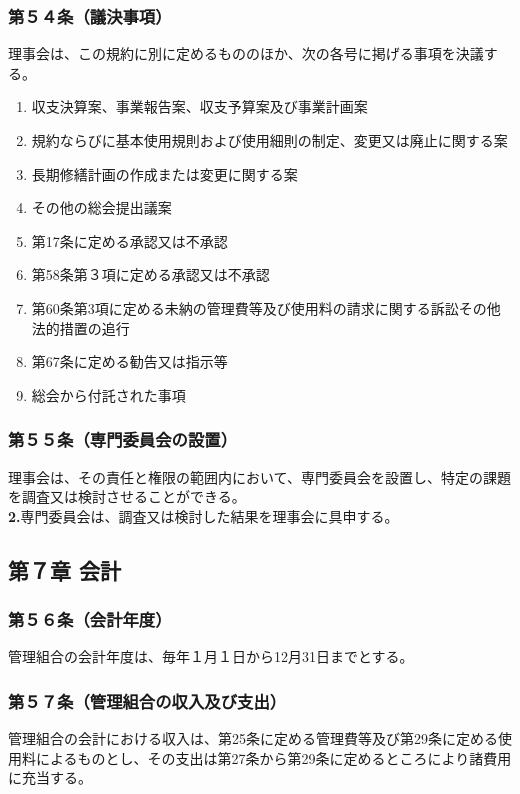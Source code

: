 \documentclass[12pt,uplatex]{jsarticle}
\begin{document}
\subsubsection*{第５４条（議決事項）}
理事会は、この規約に別に定めるもののほか、次の各号に掲げる事項を決議する。
\begin{enumerate}
\item 収支決算案、事業報告案、収支予算案及び事業計画案
\item 規約ならびに基本使用規則および使用細則の制定、変更又は廃止に関する案
\item 長期修繕計画の作成または変更に関する案
\item その他の総会提出議案
\item 第17条に定める承認又は不承認
\item 第58条第３項に定める承認又は不承認
\item 第60条第3項に定める未納の管理費等及び使用料の請求に関する訴訟その他法的措置の追行
\item 第67条に定める勧告又は指示等
\item 総会から付託された事項
\end{enumerate}
\subsubsection*{第５５条（専門委員会の設置）}
理事会は、その責任と権限の範囲内において、専門委員会を設置し、特定の課題を調査又は検討させることができる。\\
\textbf{2.}専門委員会は、調査又は検討した結果を理事会に具申する。

\begin{center}
\subsection*{第７章 会計}
\end{center}
\subsubsection*{第５６条（会計年度）}
管理組合の会計年度は、毎年１月１日から12月31日までとする。
\subsubsection*{第５７条（管理組合の収入及び支出）}
管理組合の会計における収入は、第25条に定める管理費等及び第29条に定める使用料によるものとし、その支出は第27条から第29条に定めるところにより諸費用に充当する。
\end{document}
